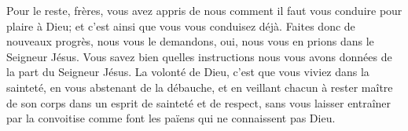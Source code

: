 Pour le reste, frères,
	vous avez appris de nous comment il faut vous conduire pour plaire à Dieu;
	et c’est ainsi que vous vous conduisez déjà.
Faites donc de nouveaux progrès, nous vous le demandons,
	oui, nous vous en prions dans le Seigneur Jésus.
Vous savez bien quelles instructions nous vous avons données de la part du Seigneur Jésus.
La volonté de Dieu, c’est que vous viviez dans la sainteté,
	en vous abstenant de la débauche, et en veillant chacun à rester maître de son corps
		dans un esprit de sainteté et de respect,
	sans vous laisser entraîner par la convoitise
		comme font les païens qui ne connaissent pas Dieu.
